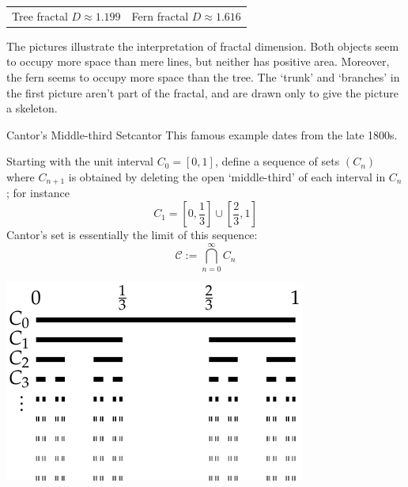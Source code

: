 \begin{example}{}{}
\begin{center}
\begin{tabular}{c@{\qquad\qquad}c}
			\\
			Tree fractal $D\approx 1.199$
			&
			Fern fractal $D\approx 1.616$
		\end{tabular}
	\end{center}
	The pictures illustrate the interpretation of fractal dimension. Both objects seem to occupy more space than mere lines, but neither has positive area. Moreover, the fern seems to occupy more space than the tree. The `trunk' and `branches' in the first picture aren't part of the fractal, and are drawn only to give the picture a skeleton. %
\end{example}


\goodbreak


\begin{example}{Cantor's Middle-third Set}{cantor}
	This famous example dates from the late 1800s.\footnotemark{}\par
	\begin{minipage}[t]{0.58\linewidth}\vspace{-5pt}
		Starting with the unit interval $C_0=[0,1]$, define a sequence of sets $(C_n)$ where $C_{n+1}$ is obtained by deleting the open `middle-third' of each interval in $C_n$; for instance
		\[
			C_1=\left[0,\frac 13\right]\cup\left[\frac 23,1\right]
		\]
		Cantor's set is essentially the limit of this sequence:
		\[
			\mathcal C:=\bigcap_{n=0}^\infty C_n
		\]
	\end{minipage}
	\hfill
	\begin{minipage}[t]{0.4\linewidth}\vspace{-7pt}
		\flushright
	\href{http://www.math.uci.edu/~ndonalds/math161/cantor-similar.html}{\includegraphics{cantor-set}}
	\end{minipage}
	\medbreak


\end{example}
